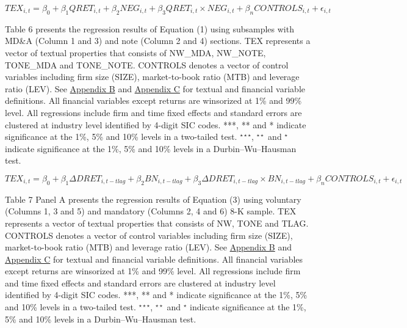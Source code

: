 \newpage

\setcounter{equation}{0}
\begin{equation}
TEX_{i,t}=\beta_0+\beta_1QRET_{i,t}+\beta_2NEG_{i,t}+\beta_3QRET_{i,t}\times NEG_{i,t}+\beta_nCONTROLS_{i,t}+\epsilon_{i,t}
\end{equation}

Table 6 presents the regression results of Equation (1) using subsamples with MD\&A (Column 1 and 3) and note (Column 2 and 4) sections. TEX represents a vector of textual properties that consists of NW\_MDA, NW\_NOTE, TONE\_MDA and TONE\_NOTE. CONTROLS denotes a vector of control variables including firm size (SIZE), market-to-book ratio (MTB) and leverage ratio (LEV). See \hyperref[appb]{Appendix B} and \hyperref[appc]{Appendix C} for textual and financial variable definitions. All financial variables except returns are winsorized at 1\% and 99\% level. All regressions include firm and time fixed effects and standard errors are clustered at industry level identified by 4-digit SIC codes. ***, ** and * indicate significance at the 1\%, 5\% and 10\% levels in a two-tailed test. $^{\star\star\star}$, $^{\star\star}$ and $^{\star}$ indicate significance at the 1\%, 5\% and 10\% levels in a Durbin–Wu–Hausman test.

\newpage

\setcounter{equation}{2}
\begin{equation}
	TEX_{i,t}=\beta_0+\beta_1\Delta DRET_{i,t-tlag}+\beta_2BN_{i,t-tlag}+\beta_3\Delta DRET_{i,t-tlag}\times BN_{i,t-tlag}+\beta_nCONTROLS_{i,t}+\epsilon_{i,t}
\end{equation}

Table 7 Panel A presents the regression results of Equation (3) using voluntary (Columns 1, 3 and 5) and mandatory (Columns 2, 4 and 6) 8-K sample. TEX represents a vector of textual properties that consists of NW, TONE and TLAG. CONTROLS denotes a vector of control variables including firm size (SIZE), market-to-book ratio (MTB) and leverage ratio (LEV). See \hyperref[appb]{Appendix B} and \hyperref[appc]{Appendix C} for textual and financial variable definitions. All financial variables except returns are winsorized at 1\% and 99\% level. All regressions include firm and time fixed effects and standard errors are clustered at industry level identified by 4-digit SIC codes. ***, ** and * indicate significance at the 1\%, 5\% and 10\% levels in a two-tailed test. $^{\star\star\star}$, $^{\star\star}$ and $^{\star}$ indicate significance at the 1\%, 5\% and 10\% levels in a Durbin–Wu–Hausman test.

